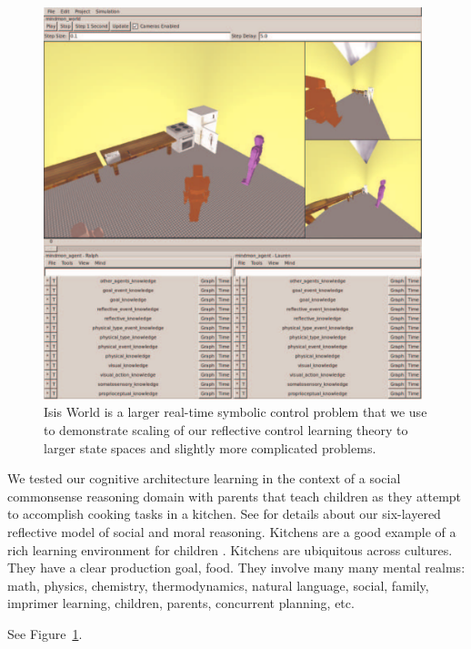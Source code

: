 \begin{figure}[bth]
  \center
  \includegraphics[width=11cm]{gfx/mindmon-isis_world-screenshot-1}
  \caption[Isis World is a larger real-time symbolic control
    problem.]{Isis World is a larger real-time symbolic control
    problem that we use to demonstrate scaling of our reflective
    control learning theory to larger state spaces and slightly more
    complicated problems.}
  \label{fig:mindmon-isis_world-screenshot-1}
\end{figure}

We tested our cognitive architecture learning in the context of a
social commonsense reasoning domain with parents that teach children
as they attempt to accomplish cooking tasks in a kitchen.  See
\cite{morgan:2011} for details about our six-layered reflective model
of social and moral reasoning.  Kitchens are a good example of a rich
learning environment for children \citep{dewey:1907}.  Kitchens are
ubiquitous across cultures.  They have a clear production goal, food.
They involve many many mental realms: math, physics, chemistry,
thermodynamics, natural language, social, family, imprimer learning,
children, parents, concurrent planning, etc.

See Figure~\ref{fig:mindmon-isis_world-screenshot-1}.
